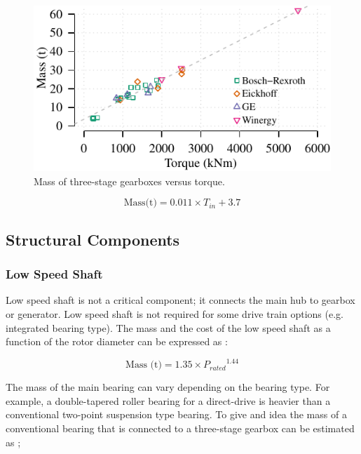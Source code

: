 \documentclass{article}\usepackage{graphicx, color}
\makeatletter
\def\maxwidth{ %
  \ifdim\Gin@nat@width>\linewidth
    \linewidth
  \else
    \Gin@nat@width
  \fi
}
\newenvironment{knitrout}{}{} %
\makeatother
\begin{document}
\begin{knitrout}
\color{fgcolor}\begin{figure}[]

\includegraphics[width=\maxwidth]{figure/gearbox} \caption[Mass of three-stage gearboxes versus torque]{Mass of three-stage gearboxes versus torque.\label{fig:gearbox}}
\end{figure}


\end{knitrout}

\begin{equation}
\text{Mass(t)} = 0.011 \times T_{in} + 3.7
\label{3G_gearbox}
\end{equation}

\subsection{Structural Components}

\subsubsection{Low Speed Shaft}
Low speed shaft is not a critical component; it connects the main hub to gearbox or generator. Low speed shaft is not required for some drive train options (e.g. integrated bearing type). The mass and the cost of the low speed shaft as a function of the rotor diameter can be expressed as \cite{Fingersh2006}:

\begin{equation}
	\text{Mass (t)} = 1.35 \times {P_{rated}}^{1.44}
\end{equation}


The mass of the main bearing can vary depending on the bearing type. For example, a double-tapered roller bearing for a direct-drive is heavier than a conventional two-point suspension type bearing. To give and idea the mass of a conventional bearing that is connected to a three-stage gearbox can be estimated as \cite{Fingersh2006};
\end{document}
